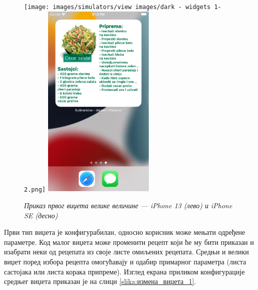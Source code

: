 \documentclass[12pt,oneside]{memoir}
\begin{document}
\begin{figure} [H]
    \centering
    \captionsetup{justification=centering}
    \texttt{[image: images/simulators/view images/dark - widgets 1-2.png]} 
    \hfill
    \includegraphics[width=0.475\textwidth]{images/simulators/view images/light - widgets 1-2.png} 
    \caption{\textit{Приказ првог виџета велике величине --- iPhone 13 (лево) и iPhone SE (десно)}}
    \label{slika:приказ_виџета_2_1}
\end{figure}

\indent Први тип виџета је конфигурабилан, односно корисник може мењати одређене параметре. Код малог виџета може променити рецепт који ће му бити приказан и изабрати неки од рецепата из своје листе омиљених рецепата. Средњи и велики виџет поред избора рецепта омогућавају и одабир примарног параметра (листа састојака или листа корака припреме). Изглед екрана приликом конфигурације средњег виџета приказан је на слици  \ref{slika:измена_виџета_1}.
\end{document}

